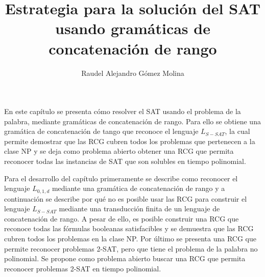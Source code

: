 \documentclass[12pt]{article}
\title{Estrategia para la solución del SAT usando gramáticas de concatenación de rango}
\author{Raudel Alejandro Gómez Molina}
\begin{document}
\maketitle





En este capítulo se presenta cómo resolver el SAT usando el problema de la palabra, mediante gramáticas de 
concatenación de rango. Para ello se obtiene una gramática de concatenación de tango que reconoce el lenguaje $L_{S-SAT}$, la cual permite demostrar que las RCG cubren todos los problemas que pertenecen a la clase NP y se deja como problema abierto obtener una RCG que permita reconocer todas las instancias de SAT que son solubles en tiempo polinomial.

Para el desarrollo del capítulo primeramente se describe como reconocer el lenguaje $L_{0,1,d}$ mediante una gramática de concatenación de rango y a continuación se describe por qué no es posible usar las RCG para construir el lenguaje $L_{S-SAT}$ mediante una transducción finita de un lenguaje de concatenación de rango. A pesar de ello, es posible construir una RCG que reconoce todas las fórmulas booleanas satisfacibles y se demuestra que las RCG cubren todos los problemas en la clase NP. Por último se presenta una RCG que permite reconocer problemas 2-SAT, pero que tiene el problema de la palabra no polinomial. Se propone como problema abierto buscar una RCG que permita reconocer problemas 2-SAT en tiempo polinomial.
\end{document}
